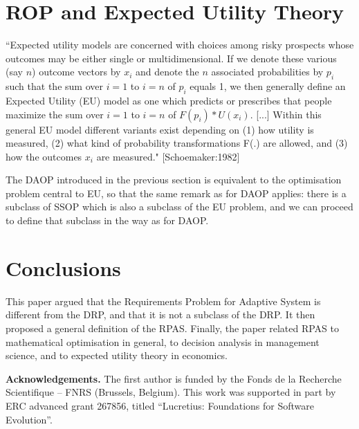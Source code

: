 \documentclass[graybox]{svmult}
\newcommand{\xb}[1]{\textbf{#1}}
\newcommand{\RPfull}{Requirements Problem}
\newcommand{\ASfull}{Adaptive System}
\newcommand{\RPASfull}{\RPfull{} for \ASfull}
\newcommand{\RPAS}{RPAS}
\newcommand{\ZJRP}{DRP}
\newcommand{\ROP}{ROP}
\begin{document}
\section{\ROP{} and Expected Utility Theory}\label{s:expected-utility-theory}
``Expected utility models are concerned with choices among risky prospects whose outcomes may be either single or multidimensional. If we denote these various (say $n$) outcome vectors by $x_{i}$ and denote the $n$ associated probabilities by $p_{i}$ such that the sum over $i = 1$ to $i = n$ of $p_{i}$ equals 1, we then generally define an Expected Utility (EU) model as one which predicts or prescribes that people maximize the sum over $i = 1$ to $i = n$ of $F(p_{i}) * U(x_{i})$. [...] Within this general EU model different variants exist depending on (1) how utility is measured, (2) what kind of probability transformations F(.) are allowed, and (3) how the outcomes $x_{i}$ are measured." [Schoemaker:1982]

The DAOP introduced in the previous section is equivalent to the optimisation problem central to EU, so that the same remark as for DAOP applies: there is a subclass of SSOP which is also a subclass of the EU problem, and we can proceed to define that subclass in the way as for DAOP. 


%
\section{Conclusions}
This paper argued that the \RPASfull{} is different from the \ZJRP, and that it is not a subclass of the \ZJRP. It then proposed a general definition of the \RPAS. Finally, the paper related \RPAS{} to mathematical optimisation in general, to decision analysis in management science, and to expected utility theory in economics.



\xb{Acknowledgements.} The first author is funded by the Fonds de la Recherche Scientifique -- FNRS (Brussels, Belgium). This work was supported in part by ERC advanced grant 267856, titled ``Lucretius: Foundations for Software Evolution''.




%
\end{document}
